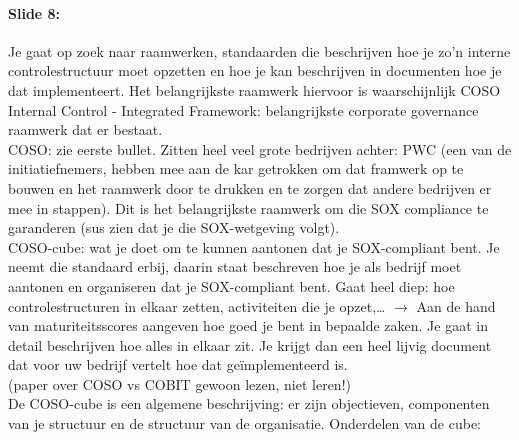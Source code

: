 \documentclass[10pt,a4paper]{report}
\begin{document}
\paragraph{Slide 8:}Je gaat op zoek naar raamwerken, standaarden die beschrijven hoe je zo'n interne controlestructuur moet opzetten en hoe je kan beschrijven in documenten hoe je dat implementeert. Het belangrijkste raamwerk hiervoor is waarschijnlijk COSO Internal Control - Integrated Framework: belangrijkste corporate governance raamwerk dat er bestaat.\\
COSO: zie eerste bullet. Zitten heel veel grote bedrijven achter: PWC (een van de initiatiefnemers, hebben mee aan de kar getrokken om dat framwerk op te bouwen en het raamwerk door te drukken en te zorgen dat andere bedrijven er mee in stappen). Dit is het belangrijkste raamwerk om die SOX compliance te garanderen (sus zien dat je die SOX-wetgeving volgt).\\
COSO-cube: wat je doet om te kunnen aantonen dat je SOX-compliant bent. Je neemt die standaard erbij, daarin staat beschreven hoe je als bedrijf moet aantonen en organiseren dat je SOX-compliant bent. Gaat heel diep: hoe controlestructuren in elkaar zetten, activiteiten die je opzet,… $\rightarrow$ Aan de hand van maturiteitsscores aangeven hoe goed je bent in bepaalde zaken. Je gaat in detail beschrijven hoe alles in elkaar zit. Je krijgt dan een heel lijvig document dat voor uw bedrijf vertelt hoe dat geïmplementeerd is.\\
(paper over COSO vs COBIT gewoon lezen, niet leren!)\\
De COSO-cube is een algemene beschrijving: er zijn objectieven, componenten van je structuur en de structuur van de organisatie. Onderdelen van de cube:
\end{document}
